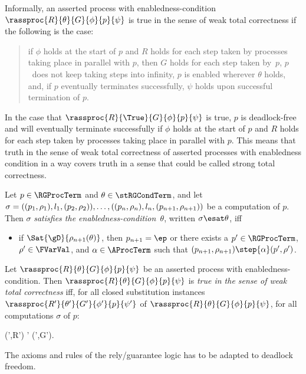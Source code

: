 \documentclass[runningheads]{llncs}
\begin{document}
Informally, an asserted process with enabledness-condition 
$\rassproc{R}{\theta}{G}{\phi}{p}{\psi}$ is true in the sense of weak 
total correctness if the following is the case:
\begin{quote}
if $\phi$ holds at the start of $p$ and $R$ holds for each step taken by
processes taking place in parallel with $p$, then $G$ holds for each 
step taken by~$p$, $p$~does not keep taking steps into infinity, $p$ is 
enabled wherever $\theta$ holds, and, if $p$ eventually terminates 
successfully, $\psi$ holds upon successful termination of $p$. 
\end{quote}
In the case that $\rassproc{R}{\True}{G}{\phi}{p}{\psi}$ is true, $p$ is 
deadlock-free and will eventually terminate successfully if $\phi$ holds 
at the start of $p$ and $R$ holds for each step taken by processes 
taking place in parallel with $p$.
This means that truth in the sense of weak total correctness of asserted
processes with enabledness condition in a way covers truth in a sense 
that could be called strong total correctness.

Let $p \in \RGProcTerm$ and $\theta \in \stRGCondTerm$, and let
$\sigma = 
 ((p_1,\rho_1), l_1, (p_2,\rho_2)), \ldots, 
 ((p_n,\rho_n), l_n, \linebreak[2] (p_{n+1},\rho_{n+1}))$
be a computation of $p$.
Then $\sigma$ \emph{satisfies the enabledness-condition~$\theta$}, 
written $\sigma \esat \theta$, iff
\begin{itemize}
\item
if $\Sat{\gD}{\rho_{n+1}(\theta)}$, then $p_{n+1} = \ep$ or there exists 
a $p' \in \RGProcTerm$, $\rho' \in \FVarVal$, and $\alpha \in \AProcTerm$ 
such that $(p_{n+1},\rho_{n+1}) \step{\alpha} (p',\rho')$.
\end{itemize}

Let $\rassproc{R}{\theta}{G}{\phi}{p}{\psi}$ be an asserted process with 
enabledness-condition.
Then $\rassproc{R}{\theta}{G}{\phi}{p}{\psi}$ is 
\emph{true in the sense of weak total correctness} iff, 
for all closed substitution instances 
$\rassproc{R'}{\theta'}{G'}{\phi'}{p}{\psi'}$ of 
$\rassproc{R}{\theta}{G}{\phi}{p}{\psi}$,
for all computations $\sigma$ of $p$:
\begin{ldispl}
\sigma \asat (\phi',R') \quad{}\quad
\conv \sigma \;\;\;\; \sigma \esat \theta' \;\;\;\;
 \sigma \csat (\psi',G')\;.
\end{ldispl}%

The axioms and rules of the rely/guarantee logic has to be adapted to
deadlock freedom.
\end{document}
